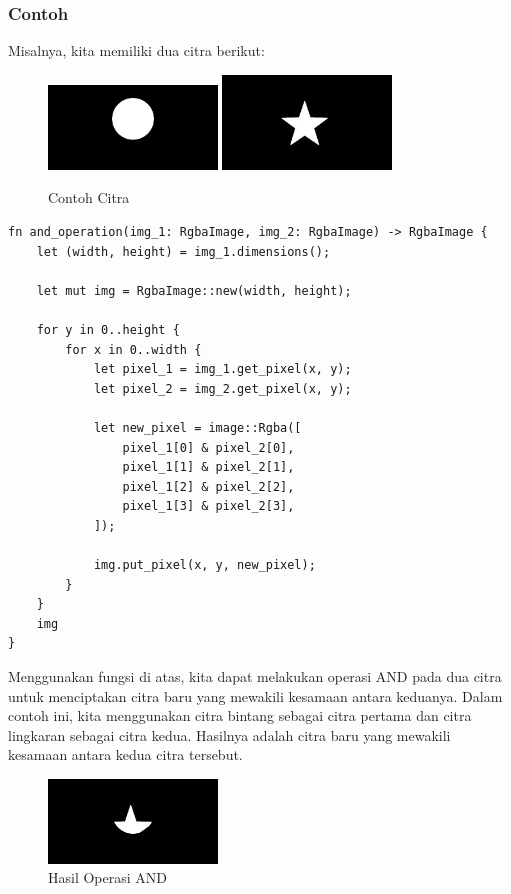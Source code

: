 \documentclass[a4paper,12pt,openany]{book}
\begin{document}
\subsubsection{Contoh}
Misalnya, kita memiliki dua citra berikut:
\begin{figure}[H]
    \centering
    \includegraphics[width=0.4\textwidth]{./image/boolean/circle.png}
    \includegraphics[width=0.4\textwidth]{./image/boolean/star-1.jpg}
    \caption{Contoh Citra}
\end{figure}

\begin{lstlisting}
fn and_operation(img_1: RgbaImage, img_2: RgbaImage) -> RgbaImage {
    let (width, height) = img_1.dimensions();

    let mut img = RgbaImage::new(width, height);

    for y in 0..height {
        for x in 0..width {
            let pixel_1 = img_1.get_pixel(x, y);
            let pixel_2 = img_2.get_pixel(x, y);

            let new_pixel = image::Rgba([
                pixel_1[0] & pixel_2[0],
                pixel_1[1] & pixel_2[1],
                pixel_1[2] & pixel_2[2],
                pixel_1[3] & pixel_2[3],
            ]);

            img.put_pixel(x, y, new_pixel);
        }
    }
    img
}
\end{lstlisting}

Menggunakan fungsi di atas, kita dapat melakukan operasi AND pada dua citra untuk menciptakan citra baru yang mewakili kesamaan antara keduanya. Dalam contoh ini, kita menggunakan citra bintang sebagai citra pertama dan citra lingkaran sebagai citra kedua. Hasilnya adalah citra baru yang mewakili kesamaan antara kedua citra tersebut.

\begin{figure}[H]
    \centering
    \includegraphics[width=0.4\textwidth]{./image/boolean/output-and-operation.png}
    \caption{Hasil Operasi AND}
\end{figure}
\end{document}
